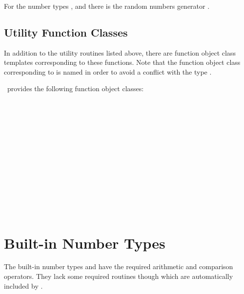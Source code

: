 For the number types , and  there is
the random numbers generator .





\subsection{Utility Function Classes}
In addition to the utility routines listed above, 
there are function object class templates corresponding to these functions.
Note that the function object class corresponding to  is
named  in order to avoid a conflict with the type 
.

\cgal\ provides the following function object classes:


\\
\\
\\
\\
\\
\\
\\
\\
 \\
 \\
 \\
 \\

\section{Built-in Number Types}

The built-in number types  and  have the
required arithmetic and comparison operators. They lack some required
routines though which are automatically included by \cgal.

